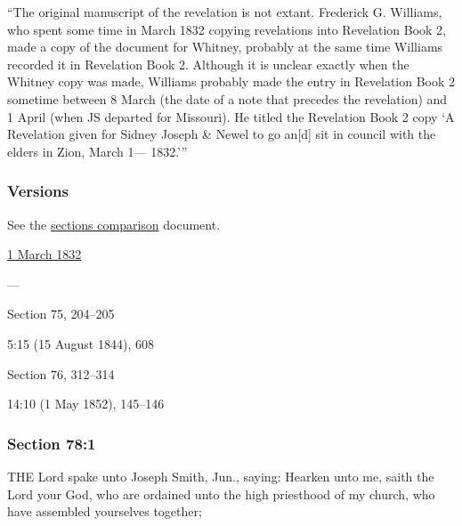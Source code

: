 			``The original manuscript of the revelation is not extant. Frederick G. Williams, who spent some time in March 1832 copying revelations into Revelation Book 2, made a copy of the document for Whitney, probably at the same time Williams recorded it in Revelation Book 2. Although it is unclear exactly when the Whitney copy was made, Williams probably made the entry in Revelation Book 2 sometime between 8 March (the date of a note that precedes the revelation) and 1 April (when JS departed for Missouri). He titled the Revelation Book 2 copy `A Revelation given for Sidney Joseph \& Newel to go an[d] sit in council with the elders in Zion, March 1--- 1832.'''
		
	\subsubsection{Versions}
		\label{DC78-V}
		
		See the \href{https://drive.google.com/file/d/1goAvNz8jS4R8slYfMG_db55Ty2z_vmgK/view?usp=sharing}{sections comparison} document.
	
		\begin{compactdesc}
			\item[JSP] \hyperref[EMS-1832-JS-1-MAR-1832]{1 March 1832}
			\item[BC] ---
			\item[DC 1835] Section 75, 204--205
			\item[TS] 5:15 (15 August 1844), 608
			\item[DC 1844] Section 76, 312--314
			\item[MS] 14:10 (1 May 1852), 145--146
		\end{compactdesc}

	\subsubsection{Section 78:1} %
		\label{DC78-1}

		THE Lord spake unto Joseph Smith, Jun., saying: Hearken unto me, saith the Lord your God, who are ordained unto the high priesthood of my church, who have assembled yourselves together;

